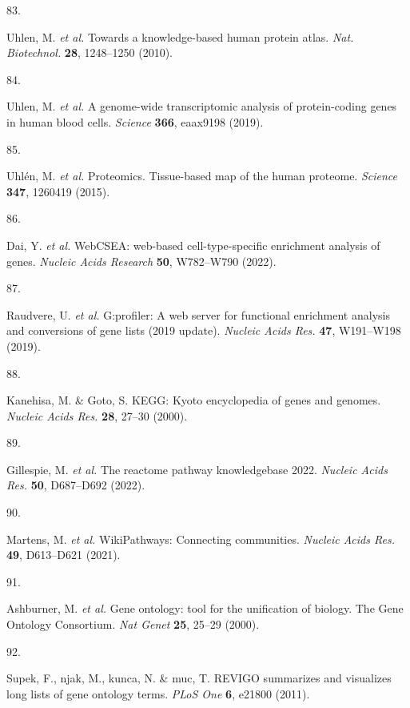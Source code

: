 \documentclass[
  11,
  a4paper,
]{article}
\newlength{\cslhangindent}
\newlength{\csllabelwidth}
\newlength{\cslentryspacingunit} %
\newenvironment{CSLReferences}[2] %
 {%
  \setlength{\parindent}{0pt}
  \ifodd #1
  \let\oldpar\par
  \def\par{\hangindent=\cslhangindent\oldpar}
  \fi
  \setlength{\parskip}{#2\cslentryspacingunit}
 }%
 {}
\newcommand{\CSLLeftMargin}[1]{\parbox[t]{\csllabelwidth}{#1}}
\newcommand{\CSLRightInline}[1]{\parbox[t]{\linewidth - \csllabelwidth}{#1}\break}
\begin{document}
\begin{CSLReferences}{0}{0}
\leavevmode{}%
\CSLLeftMargin{83. }%
\CSLRightInline{Uhlen, M. \emph{et al.} Towards a knowledge-based human
protein atlas. \emph{Nat. Biotechnol.} \textbf{28}, 1248--1250 (2010).}

\leavevmode{}%
\CSLLeftMargin{84. }%
\CSLRightInline{Uhlen, M. \emph{et al.} A genome-wide transcriptomic
analysis of protein-coding genes in human blood cells. \emph{Science}
\textbf{366}, eaax9198 (2019).}

\leavevmode{}%
\CSLLeftMargin{85. }%
\CSLRightInline{Uhlén, M. \emph{et al.} Proteomics. Tissue-based map of
the human proteome. \emph{Science} \textbf{347}, 1260419 (2015).}

\leavevmode{}%
\CSLLeftMargin{86. }%
\CSLRightInline{Dai, Y. \emph{et al.} {WebCSEA: web-based
cell-type-specific enrichment analysis of genes}. \emph{Nucleic Acids
Research} \textbf{50}, W782--W790 (2022).}

\leavevmode{}%
\CSLLeftMargin{87. }%
\CSLRightInline{Raudvere, U. \emph{et al.} G:profiler: A web server for
functional enrichment analysis and conversions of gene lists (2019
update). \emph{Nucleic Acids Res.} \textbf{47}, W191--W198 (2019).}

\leavevmode{}%
\CSLLeftMargin{88. }%
\CSLRightInline{Kanehisa, M. \& Goto, S. {KEGG}: Kyoto encyclopedia of
genes and genomes. \emph{Nucleic Acids Res.} \textbf{28}, 27--30
(2000).}

\leavevmode{}%
\CSLLeftMargin{89. }%
\CSLRightInline{Gillespie, M. \emph{et al.} The reactome pathway
knowledgebase 2022. \emph{Nucleic Acids Res.} \textbf{50}, D687--D692
(2022).}

\leavevmode{}%
\CSLLeftMargin{90. }%
\CSLRightInline{Martens, M. \emph{et al.} {WikiPathways}: Connecting
communities. \emph{Nucleic Acids Res.} \textbf{49}, D613--D621 (2021).}

\leavevmode{}%
\CSLLeftMargin{91. }%
\CSLRightInline{Ashburner, M. \emph{et al.} {{G}ene ontology: tool for
the unification of biology. {T}he {G}ene {O}ntology {C}onsortium}.
\emph{Nat Genet} \textbf{25}, 25--29 (2000).}

\leavevmode{}%
\CSLLeftMargin{92. }%
\CSLRightInline{Supek, F., njak, M., kunca, N. \& muc, T.
{{R}{E}{V}{I}{G}{O} summarizes and visualizes long lists of gene
ontology terms}. \emph{PLoS One} \textbf{6}, e21800 (2011).}


\end{CSLReferences}
\end{document}
